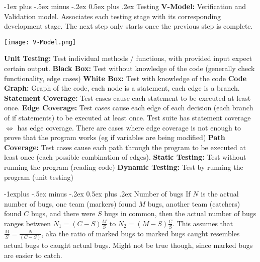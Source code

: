 \documentclass[letterpaper, 8pt]{extarticle}
\makeatletter
\renewcommand{\section}{\@startsection{section}{1}{0mm}%
                                {-1ex plus -.5ex minus -.2ex}%
                                {0.5ex plus .2ex}%
                                {\normalfont\normalsize\bfseries}}
\renewcommand{\subsection}{\@startsection{subsection}{2}{0mm}%
                                {-1explus -.5ex minus -.2ex}%
                                {0.5ex plus .2ex}%
                                {\normalfont\small\bfseries}}
\makeatother
\begin{document}
\begin{multicols*}{6}
  \section{Testing}
  \textbf{V-Model:} Verification and Validation model. Associates each testing stage with its corresponding development stage. The next
  step only starts once the previous step is complete.
  \begin{center}
    \texttt{[image: V-Model.png]}
  \end{center}
  \textbf{Unit Testing:} Test individual methods / functions, with provided input expect certain output.
  \textbf{Black Box:} Test without knowledge of the code (generally check functionality, edge cases)
  \textbf{White Box:} Test with knowledge of the code
  \textbf{Code Graph:} Graph of the code, each node is a statement, each edge is a branch.
  \textbf{Statement Coverage:} Test cases cause each statement to be executed at least once.
  \textbf{Edge Coverage:} Test cases cause each edge of each decision (each branch of if statements) to be executed at least once.
  Test suite has statement coverage $\Leftrightarrow$ has edge coverage.
  There are cases where edge coverage is not enough to prove that the program works
  (eg if variables are being modified)
  \textbf{Path Coverage:} Test cases cause each path through the program to be executed at least once (each possible combination of edges).
  \textbf{Static Testing:} Test without running the program (reading code)
  \textbf{Dynamic Testing:} Test by running the program (unit testing)

  \subsection{Number of bugs}
  If $N$ is the actual number of bugs, one team (markers) found $M$ bugs, another team (catchers) found $C$ bugs, and there were $S$ bugs in common,
  then the actual number of bugs ranges between $N_1 = (C - S) \frac{M}{S}$ to $N_2 = (M - S) \frac{C}{S}$.
  This assumes that $\frac{M}{S} = \frac{N}{(C-S)}$, aka the ratio of marked bugs to marked bugs caught resembles actual bugs to caught actual bugs. Might not be true though, since marked bugs are easier to catch.

\end{multicols*}
\end{document}
